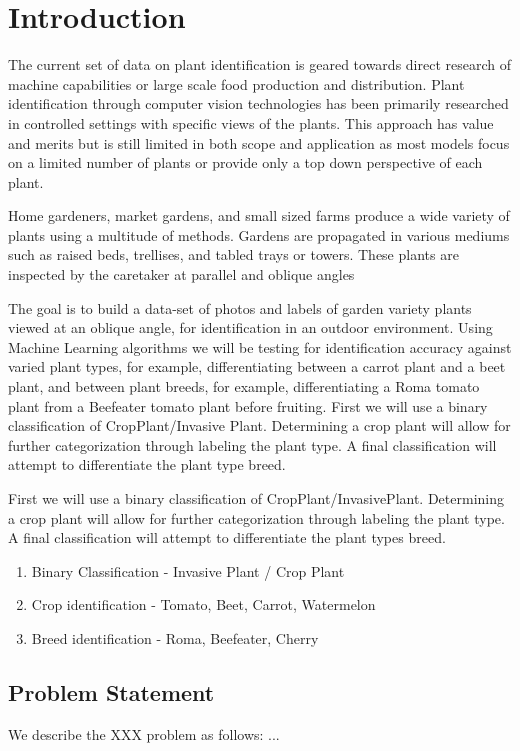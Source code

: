 \chapter{Introduction}

The current set of data on plant identification is geared towards direct research of machine capabilities or large scale food production and distribution.
Plant identification through computer vision technologies has been primarily  researched in controlled settings with specific  views of the plants. This approach has value and merits but is still limited in both scope and application as most models focus on a limited number of plants or provide only a top down perspective of each plant.

Home gardeners, market gardens, and small sized farms produce a wide variety of plants using a multitude of methods. Gardens are propagated in various mediums such as raised beds, trellises, and tabled trays or towers. These plants are inspected by the caretaker at parallel and oblique angles  

The goal is to build a data-set of photos and labels of garden variety plants viewed at an oblique angle, for identification in an outdoor environment. Using Machine Learning algorithms we will be testing for identification accuracy against varied plant types, for example, differentiating between a carrot plant and a beet plant, and between plant breeds, for example, differentiating  a Roma tomato plant from a Beefeater tomato plant before fruiting. First we will use a binary classification of CropPlant/Invasive Plant. Determining a crop plant will allow for further categorization through labeling the plant type. A final classification will attempt to differentiate the plant type breed.

First we will use a binary classification of CropPlant/InvasivePlant. Determining a crop plant will allow for further categorization through labeling the plant type. A final classification will attempt to differentiate the plant types breed.

\begin{enumerate}
\item Binary Classification - Invasive Plant / Crop Plant
\item Crop identification - Tomato, Beet, Carrot, Watermelon
\item Breed identification - Roma, Beefeater, Cherry 
\end{enumerate}

\section{Problem Statement} \label{sec:problem-statement}
We describe the XXX problem as follows: ...

